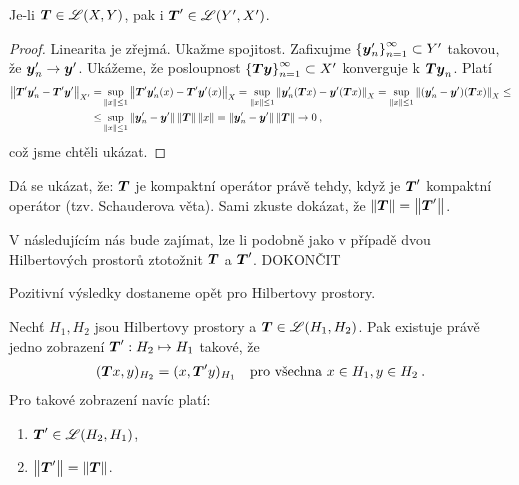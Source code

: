 \begin{lemma}
Je-li $\boldsymbol{T} \in \mathscr{L} (X,Y)$, pak i $\boldsymbol{T}' \in \mathscr{L}(Y', X')$. 
\end{lemma}
\begin{proof}
Linearita je zřejmá. Ukažme spojitost.  Zafixujme $\left \lbrace \boldsymbol{y}'_n \right \rbrace_{n=1}^\infty \subset Y'$ takovou, že $\boldsymbol{y}'_n \rightarrow \boldsymbol{y}'$. Ukážeme, že posloupnost $\left \lbrace \boldsymbol{T} \boldsymbol{y} \right \rbrace_{n=1}^\infty \subset X'$ konverguje k $\boldsymbol{T} \boldsymbol{y}_n$. Platí
\begin{align*}
    \left\lVert\boldsymbol{T}' \boldsymbol{y}'_n - \boldsymbol{T}' \boldsymbol{y}'\right\rVert_{X'} 
    =&
    \sup_{\left\lVert x\right\rVert \leq 1} \left\lVert\boldsymbol{T}' \boldsymbol{y}'_n (x)- \boldsymbol{T}' \boldsymbol{y}' (x)\right\rVert_X 
    =
    \sup_{\left\lVert x\right\rVert \leq 1} \left\lVert\boldsymbol{y}'_n  (\boldsymbol{T} x)- \boldsymbol{y}' (\boldsymbol{T} x)\right\rVert_X 
    =
    \sup_{\left\lVert x\right\rVert \leq 1} \left\lVert(\boldsymbol{y}'_n-\boldsymbol{y}') (\boldsymbol{T} x)\right\rVert_X 
    \leq \\
    \leq&
     \sup_{\left\lVert x\right\rVert \leq 1} \left\lVert\boldsymbol{y}'_n - \boldsymbol{y}'\right\rVert \left\lVert\boldsymbol{T}\right\rVert \left\lVert x\right\rVert
    =
    \left\lVert\boldsymbol{y}'_n -\boldsymbol{y}'\right\rVert \left\lVert\boldsymbol{T}\right\rVert \rightarrow 0\:,
\end{align*}
což jsme chtěli ukázat.
\end{proof}

Dá se ukázat, že: $\boldsymbol{T}$ je kompaktní operátor právě tehdy, když je $\boldsymbol{T}'$ kompaktní operátor (tzv. Schauderova věta). Sami zkuste dokázat, že $\left\lVert\boldsymbol{T}\right\rVert = \left\lVert\boldsymbol{T}'\right\rVert$.

V následujícím nás bude zajímat, lze li podobně jako v případě dvou Hilbertových prostorů ztotožnit $\boldsymbol{T}$ a $\boldsymbol{T}'$. DOKONČIT

Pozitivní výsledky dostaneme opět pro Hilbertovy prostory.

\begin{theorem}
Nechť $H_1, H_2$ jsou Hilbertovy prostory a $\boldsymbol{T} \in \mathscr{L}(H_1, H_2)$. Pak existuje právě jedno zobrazení $\boldsymbol{T}' : H_2 \mapsto H_1$ takové, že 
\begin{align} \label{eq4.dualHilbert}
    (\boldsymbol{T} x, y)_{H_2} = (x, \boldsymbol{T}'y)_{H_1} \quad \text{pro všechna } x \in H_1, y \in H_2 \:.
\end{align}
Pro takové zobrazení navíc platí: \begin{enumerate}
    \item $\boldsymbol{T}' \in \mathscr{L}(H_2, H_1)$,
    \item $\left\lVert\boldsymbol{T}'\right\rVert = \left\lVert\boldsymbol{T}\right\rVert$.
\end{enumerate}
\end{theorem}

